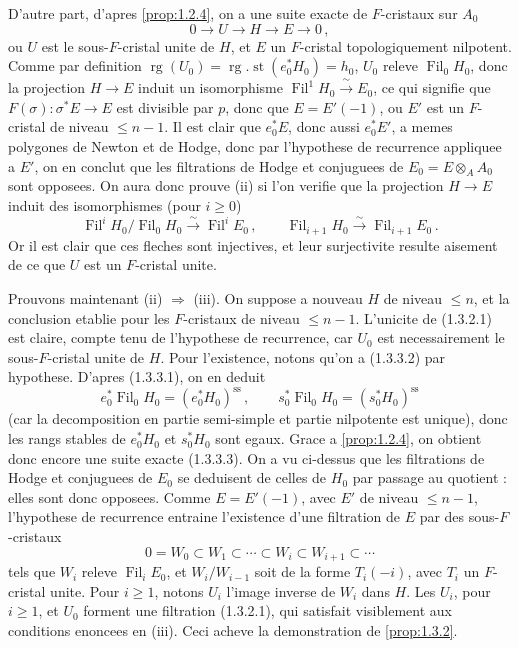 \documentclass[12pt,a4paper]{article}
\theoremstyle{plain}
\theoremstyle{definition}
\theoremstyle{remark}
\DeclareMathOperator{\Fil}{Fil}
\DeclareMathOperator{\rg}{rg}
\DeclareMathOperator{\st}{st}
\begin{document}
D'autre part, d'apres \ref{prop:1.2.4}, on a une suite exacte de $F$-cristaux sur $A_0$
\begin{equation}\label{eq:1.3.3.3}
0 \longrightarrow U \longrightarrow H \longrightarrow E \longrightarrow 0\,,
\end{equation}
ou $U$ est le sous-$F$-cristal unite de $H$, et $E$ un $F$-cristal topologiquement nilpotent. Comme par definition $\rg(U_0) = \rg\nolimits.\st(e_0^*H_0) = h_0$, $U_0$ releve $\Fil_0H_0$, donc la projection $H \to E$ induit un isomorphisme $\Fil^1H_0 \xrightarrow{\;\sim\;} E_0$, ce qui signifie que $F(\sigma) : \sigma^*E \to E$ est divisible par $p$, donc que $E = E'(-1)$, ou $E'$ est un $F$-cristal de niveau $\leq n-1$. Il est clair que $e_0^*E$, donc aussi $e_0^*E'$, a memes polygones de Newton et de Hodge, donc par l'hypothese de recurrence appliquee a $E'$, on en conclut que les filtrations de Hodge et conjuguees de $E_0 = E \otimes_A A_0$ sont opposees. On aura donc prouve (ii) si l'on verifie que la projection $H \to E$ induit des isomorphismes (pour $i \geq 0$)
\[
\Fil^iH_0/\Fil_0H_0 \xrightarrow{\;\sim\;} \Fil^iE_0\,, \qquad \Fil_{i+1}H_0 \xrightarrow{\;\sim\;} \Fil_{i+1}E_0\,.\]
Or il est clair que ces fleches sont injectives, et leur surjectivite resulte aisement de ce que $U$ est un $F$-cristal unite.

Prouvons maintenant (ii) $\Rightarrow$ (iii). On suppose a nouveau $H$ de niveau $\leq n$, et la conclusion etablie pour les $F$-cristaux de niveau $\leq n-1$. L'unicite de (1.3.2.1) est claire, compte tenu de l'hypothese de recurrence, car $U_0$ est necessairement le sous-$F$-cristal unite de $H$. Pour l'existence, notons qu'on a (1.3.3.2) par hypothese. D'apres (1.3.3.1), on en deduit
\[
e_0^*\Fil_0H_0 = (e_0^*H_0)^{\mathrm{ss}}\,, \qquad s_0^*\Fil_0H_0 = (s_0^*H_0)^{\mathrm{ss}}
\]
(car la decomposition en partie semi-simple et partie nilpotente est unique), donc les rangs stables de $e_0^*H_0$ et $s_0^*H_0$ sont egaux. Grace a \ref{prop:1.2.4}, on obtient donc encore une suite exacte (1.3.3.3). On a vu ci-dessus que les filtrations de Hodge et conjuguees de $E_0$ se deduisent de celles de $H_0$ par passage au quotient : elles sont donc opposees. Comme $E = E'(-1)$, avec $E'$ de niveau $\leq n-1$, l'hypothese de recurrence entraine l'existence d'une filtration de $E$ par des sous-$F$-cristaux
\[
0 = W_0 \subset W_1 \subset \cdots \subset W_i \subset W_{i+1} \subset \cdots
\]
tels que $W_i$ releve $\Fil_iE_0$, et $W_i/W_{i-1}$ soit de la forme $T_i(-i)$, avec $T_i$ un $F$-cristal unite. Pour $i \geq 1$, notons $U_i$ l'image inverse de $W_i$ dans $H$. Les $U_i$, pour $i \geq 1$, et $U_0$ forment une filtration (1.3.2.1), qui satisfait visiblement aux conditions enoncees en (iii). Ceci acheve la demonstration de \ref{prop:1.3.2}.
\end{document}
